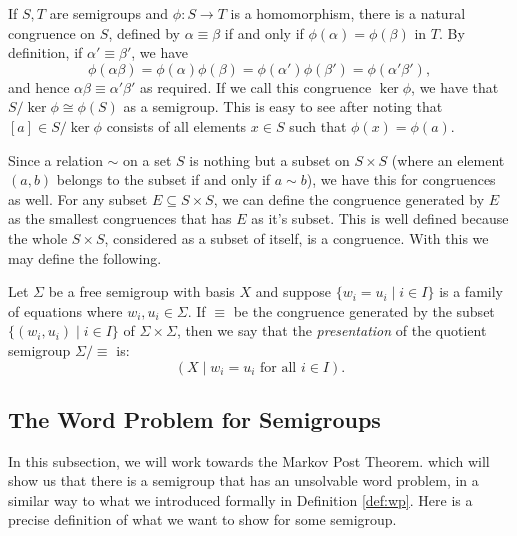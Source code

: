 \begin{example}
  If $S,T$ are semigroups and $\phi:S \rightarrow T$ is a homomorphism, there is a natural congruence on $S$, defined by $\alpha \equiv \beta$ if and only if $\phi(\alpha) = \phi(\beta)$ in $T$. By definition, if $\alpha' \equiv \beta'$, we have
  \begin{equation*}
    \phi(\alpha\beta) = \phi(\alpha)\phi(\beta) = \phi(\alpha')\phi(\beta') = \phi(\alpha'\beta'),
  \end{equation*}
  and hence $\alpha\beta \equiv \alpha'\beta'$ as required. If we call this congruence $\ker \phi$, we have that $S/\ker \phi \cong \phi(S)$ as a semigroup. This is easy to see after noting that $[a] \in S/\ker \phi$ consists of all elements $x \in S$ such that $\phi(x) = \phi(a)$.
\end{example}

Since a relation $\sim$ on a set $S$ is nothing but a subset on $S \times S$ (where an element $(a,b)$ belongs to the subset if and only if $a \sim b$), we have this for congruences as well. For any subset $E \subseteq S \times S$, we can define the congruence generated by $E$ as the smallest congruences that has $E$ as it's subset. This is well defined because the whole $S \times S$, considered as a subset of itself, is a congruence. With this we may define the following.

\begin{definition}
  Let $\Sigma$ be a free semigroup with basis $X$ and suppose $\{w_i = u_i \mid i \in I \}$ is a family of equations where $w_i,u_i \in \Sigma$. If $\equiv$ be the congruence generated by the subset $\{(w_i,u_i) \mid i \in I \}$ of $\Sigma \times \Sigma$, then we say that the \emph{presentation} of the quotient semigroup $\Sigma/\equiv$ is:
  \begin{equation*}
    (X \mid w_i = u_i \text{ for all } i \in I).
  \end{equation*}
\end{definition}

\subsection{The Word Problem for Semigroups}
\label{sec:mpt:wps}

In this subsection, we will work towards the Markov Post Theorem. which will show us that there is a semigroup that has an unsolvable word problem, in a similar way to what we introduced formally in Definition \ref{def:wp}. Here is a precise definition of what we want to show for some semigroup.

